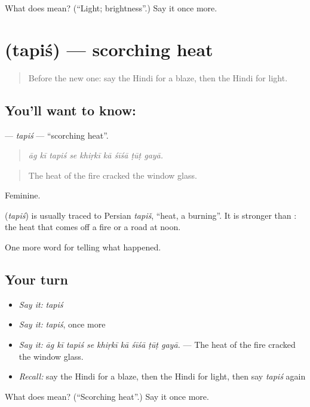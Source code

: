 \begin{tcolorbox}[breakable,colback=teal!4,colframe=teal!35!black,title={Before you move on}]
What does  mean? (\textquotedblleft{}Light; brightness\textquotedblright{}.) Say it once more.
\end{tcolorbox}
\section[\texorpdfstring{\hi{तपिश} (tapiś)}{तपिश (tapiś)}]{ (tapiś) — scorching heat}

\label{lesson:HI-C300-tapis}



\begin{quote}
Before the new one: say the Hindi for a blaze, then the Hindi for light.
\end{quote}

\subsection*{You'll want to know: }
\textbf{} — \emph{tapiś} — \textquotedblleft{}scorching heat\textquotedblright{}.

\begin{quote}
        
\end{quote}

\begin{quote}
\emph{āg kī tapiś se khiṛkī kā śīśā ṭūṭ gayā.}
\end{quote}

\begin{quote}
The heat of the fire cracked the window glass.
\end{quote}

Feminine.

\begin{cousinweb}
\textbf{} (\emph{tapiś}) is usually traced to Persian \emph{tapiš}, \textquotedblleft{}heat, a burning\textquotedblright{}. It is stronger than \textbf{}: the heat that comes off a fire or a road at noon.
\end{cousinweb}

\begin{grammarlens}[title={What you've built}]
One more word for telling what happened.
\end{grammarlens}

\subsection*{Your turn}
\begin{itemize}
\raggedright
  \item \emph{Say it:} \emph{tapiś}
  \item \emph{Say it:} \emph{tapiś}, once more
  \item \emph{Say it:} \emph{āg kī tapiś se khiṛkī kā śīśā ṭūṭ gayā.} — The heat of the fire cracked the window glass.
  \item \emph{Recall:} say the Hindi for a blaze, then the Hindi for light, then say \emph{tapiś} again
\end{itemize}

\begin{tcolorbox}[breakable,colback=teal!4,colframe=teal!35!black,title={Before you move on}]
What does  mean? (\textquotedblleft{}Scorching heat\textquotedblright{}.) Say it once more.
\end{tcolorbox}
